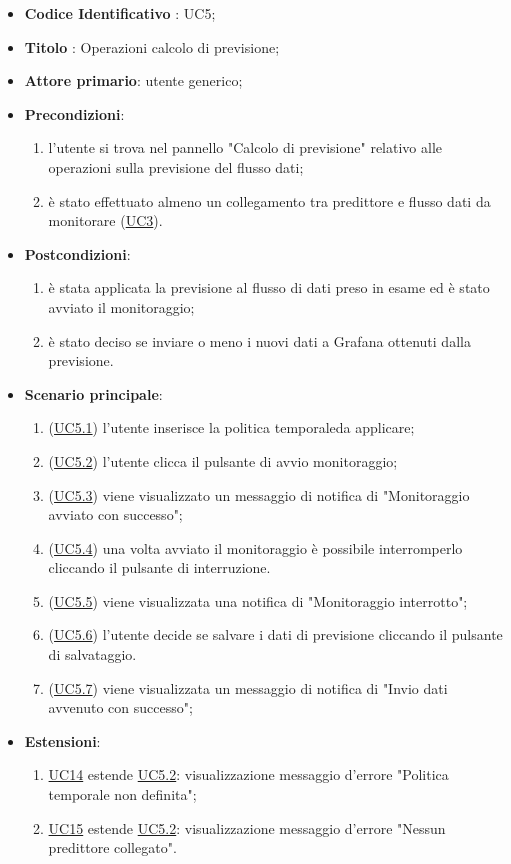 		\begin{itemize}
			\item\textbf{Codice Identificativo} : UC5;
			\item\textbf{Titolo} : Operazioni calcolo di previsione;
			\item\textbf{Attore primario}: utente generico;
			\item\textbf{Precondizioni}:
				\begin{enumerate}
					\item l'utente si trova nel pannello "Calcolo di previsione" relativo alle operazioni sulla previsione del flusso dati;
					\item è stato effettuato almeno un collegamento tra predittore e flusso dati da monitorare (\hyperref[par:UC3]{UC3}).
				\end{enumerate}		
	\item\textbf{Postcondizioni}:
				\begin{enumerate}
					\item è stata applicata la previsione al flusso di dati preso in esame ed è stato avviato il monitoraggio;
					\item è stato deciso se inviare o meno i nuovi dati a Grafana ottenuti dalla previsione.
				\end{enumerate}
			\item\textbf{Scenario principale}:
				\begin{enumerate}
					\item (\hyperref[par:UC5.1]{UC5.1}) l'utente inserisce la politica temporale\glo da applicare;
					\item (\hyperref[par:UC5.2]{UC5.2}) l'utente clicca il pulsante di avvio monitoraggio;
					\item (\hyperref[par:UC5.3]{UC5.3}) viene visualizzato un messaggio di notifica di "Monitoraggio avviato con successo";
					\item (\hyperref[par:UC5.4]{UC5.4}) una volta avviato il monitoraggio è possibile interromperlo cliccando il pulsante di interruzione.
					\item (\hyperref[par:UC5.5]{UC5.5}) viene visualizzata una notifica di "Monitoraggio interrotto";		
					\item (\hyperref[par:UC5.6]{UC5.6}) l'utente decide se salvare i dati di previsione cliccando il pulsante di salvataggio.
					\item (\hyperref[par:UC5.7]{UC5.7}) viene visualizzata un messaggio di notifica di "Invio dati avvenuto con successo";
				\end{enumerate}
			\item\textbf{Estensioni}:
				\begin{enumerate}
					\item \hyperref[par:UC14]{UC14} estende \hyperref[par:UC5.2]{UC5.2}: visualizzazione messaggio d'errore "Politica temporale non definita";
					\item \hyperref[par:UC15]{UC15} estende \hyperref[par:UC5.2]{UC5.2}: visualizzazione messaggio d'errore "Nessun predittore collegato".

				\end{enumerate}
		\end{itemize}

